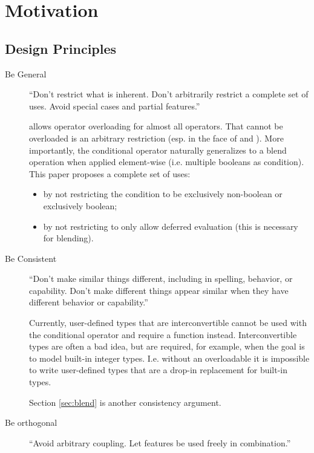 \section{Motivation}
\subsection{Design Principles}
\begin{description}
  \item[Be General] “Don’t restrict what is inherent.
    Don’t arbitrarily restrict a complete set of uses.
    Avoid special cases and partial features.” \cite{P0745R0}

    \CC{} allows operator overloading for almost all operators.
    That  cannot be overloaded is an arbitrary restriction (esp. in the face of  and ).
    More importantly, the conditional operator naturally generalizes to a blend operation when applied element-wise (i.e. multiple booleans as condition).
    This paper proposes a complete set of uses:
    \begin{itemize}
    \item by not restricting the condition to be exclusively non-boolean or exclusively boolean;
    \item by not restricting to only allow deferred evaluation (this is necessary for blending).
    \end{itemize}

  \item[Be Consistent] “Don’t make similar things different, including in spelling, behavior, or capability.
    Don’t make different things appear similar when they have different behavior or capability.”

    Currently, user-defined types that are interconvertible cannot be used with the conditional operator and require a function instead.
    Interconvertible types are often a bad idea, but are required, for example, when the goal is to model built-in integer types.
    I.e. without an overloadable  it is impossible to write user-defined types that are a drop-in replacement for built-in types.

    Section \ref{sec:blend} is another consistency argument.

  \item[Be orthogonal] “Avoid arbitrary coupling.
    Let features be used freely in combination.”


\end{description}
